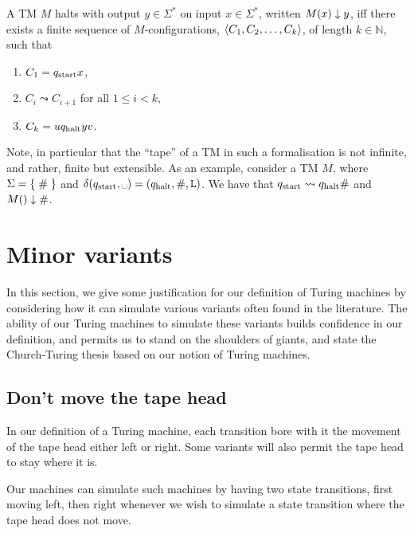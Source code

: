 \begin{definition}

A TM $M$ halts with output $y\in\Sigma^*$ on input $x\in\Sigma^*$, written
$M\mathopen{}\left({x}\right)\mathclose{}\downarrow y$, iff there exists a finite sequence of $M$-configurations,
$\mathopen{}\left\langle{C_1,C_2,\ldots, C_k}\right\rangle\mathclose{}$, of length $k\in\mathbb{N}$, such that

\begin{enumerate}

\item $C_1=q_{\text{start}} x$,

\item $C_i\leadsto C_{i+1}$ for all $1\leq i < k$,

\item $C_k=uq_{\text{halt}} yv$.

\end{enumerate}

\end{definition}

Note, in particular that the ``tape'' of a TM in such a formalisation is not
infinite, and rather, finite but extensible. As an example, consider a TM $M$,
where $\Sigma=\mathopen{}\left\{\mathrel{}{\mathtt{\#}}\mathrel{}\right\}\mathclose{}$ and $\delta\p{\qstart, \blank} =
\p{\qhalt,\#,\goleft}$. We have that $q_{\text{start}}\leadsto q_{\text{halt}}\#$ and
$M\mathopen{}\left({}\right)\mathclose{}\downarrow\#$.

\section{Minor variants}

In this section, we give some justification for our definition of Turing
machines by considering how it can simulate various variants often found in the
literature. The ability of our Turing machines to simulate these variants
builds confidence in our definition, and permits us to stand on the shoulders
of giants, and state the Church-Turing thesis based on our notion of Turing
machines.

\subsection{Don't move the tape head}

In our definition of a Turing machine, each transition bore with it the
movement of the tape head either left or right. Some variants will also permit
the tape head to stay where it is. 

Our machines can simulate such machines by having two state transitions, first
moving left, then right whenever we wish to simulate a state transition where
the tape head does not move.


